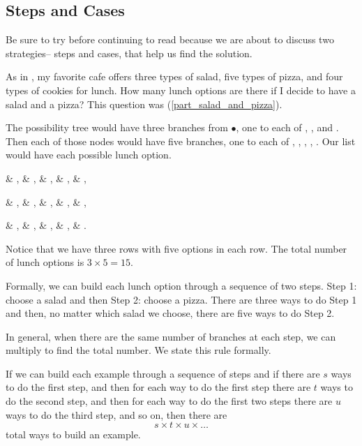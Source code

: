 \newcommand{\substepscases}{Steps and Cases}
\subsection{\substepscases}
\label{sub_steps_cases}

Be sure to try  before continuing to read because we are about to discuss two strategies-- steps and cases, that help us find the solution.

\begin{exam} 
\label{exam_salad_and_pizza}
    As in , my favorite cafe offers three types of salad, five types of pizza, and four types of cookies for lunch. How many lunch options are there if I decide to have a salad and a pizza? This question was (\ref{part_salad_and_pizza}).
    \begin{soln}
        The possibility tree would have three branches from $\bullet$, one to each of , , and .  Then each of those nodes would have five branches, one to each of , , , , . Our list would have each possible lunch option.  
        \begin{center}
             \& ,  \& ,  \& ,  \& ,  \& , 
            
             \& ,  \& ,  \& ,  \& ,   \& , 
            
             \& ,  \& ,  \& ,  \& ,   \& . 
        \end{center}
        Notice that we have three rows with five options in each row.  The total number of lunch options is $3 \times 5 = 15$. 

        Formally, we can build each lunch option through a sequence of two steps.  Step 1: choose a salad and then Step 2: choose a pizza.  There are three ways to do Step 1 and then, no matter which salad we choose, there are five ways to do Step 2.      
    \end{soln}
\end{exam}

In general, when there are the same number of branches at each step, we can multiply to find the total number.  We state this rule formally.

\begin{thm}
\label{thm_steps_multiply}
    If we can build each example through a sequence of steps and if there are $s$ ways to do the first step, and then for each way to do the first step there are $t$ ways to do the second step, and then for each way to do the first two steps there are $u$ ways to do the third step, and so on, then there are     $$s \times t \times u \times \ldots$$
    total ways to build an example.   
\end{thm}

